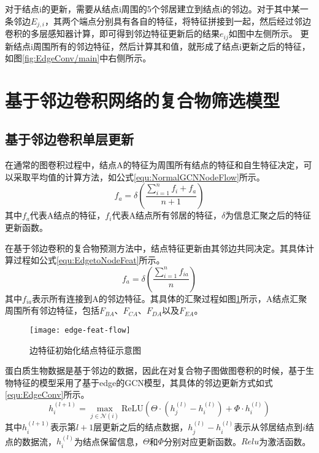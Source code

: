 对于结点i的更新，需要从结点i周围的5个邻居建立到结点i的邻边。对于其中某一条邻边$E_{j,i}$，其两个端点分别具有各自的特征，将特征拼接到一起，然后经过邻边卷积的多层感知器计算，即可得到邻边特征更新后的结果$e_{ij}$如图中左侧所示。
更新结点i周围所有的邻边特征，然后计算其和值，就形成了结点i更新之后的特征，如图\ref{fig:EdgeConv/main}中右侧所示。

\section{基于邻边卷积网络的复合物筛选模型}
\label{section:EdgeConv:detail}


\subsection{基于邻边卷积单层更新}

在通常的图卷积过程中，结点A的特征为周围所有结点的特征和自生特征决定，可以采取平均值的计算方法，如公式\ref{equ:NormalGCNNodeFlow}所示。
\begin{equation}
    \label{equ:NormalGCNNodeFlow}
    f_a=\delta (\frac{\sum_{i = 1}^{n}f_i+f_a}{n+1})
\end{equation}
其中$f_a$代表A结点的特征，$f_i$代表A结点所有邻居的特征，$\delta$为信息汇聚之后的特征更新函数。

在基于邻边卷积的复合物预测方法中，结点特征更新由其邻边共同决定。其具体计算过程如公式\ref{equ:EdgetoNodeFeat}所示。
\begin{equation}
    \label{equ:EdgetoNodeFeat}
    f_a=\delta (\frac{\sum_{i = 1}^{n}f_{ia}}{n})
\end{equation}
其中$f_{ia}$表示所有连接到A的邻边特征。其具体的汇聚过程如图\ref{fig:edge-feat-flow}所示，A结点汇聚周围所有邻边特征，包括$F_{BA}$、$F_{CA}$、$F_{DA}$以及$F_{EA}$。

\begin{figure}[htbp]
    \centering
    \texttt{[image: edge-feat-flow]}
    \caption{边特征初始化结点特征示意图}
    \label{fig:edge-feat-flow}
\end{figure}

蛋白质生物数据是基于邻边的数据，因此在对复合物子图做图卷积的时候，基于生物特征的模型采用了基于edge的GCN模型\cite{wang_dynamic_2019}，其具体的邻边更新方式如式\ref{equ:EdgeConv}所示。
\begin{equation}
    \label{equ:EdgeConv}
    h_i^{(l+1)} = \max_{j \in \mathcal{N}(i)} \mathrm{ReLU}(
    \Theta \cdot (h_j^{(l)} - h_i^{(l)}) + \Phi \cdot h_i^{(l)})
\end{equation}
其中$h_i^{(l+1)}$表示第$l+1$层更新之后的结点数据，$h_j^{(l)} - h_i^{(l)}$表示从邻居结点到$i$结点的数据流，$h_i^{(l)}$为结点保留信息，$\Theta$和$\Phi$分别对应更新函数。$Relu$为激活函数。

